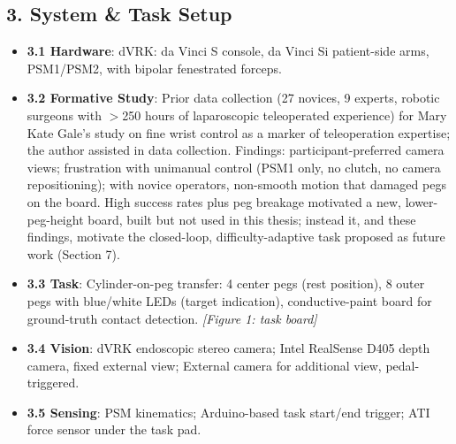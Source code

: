 \documentclass[11pt]{article}
\begin{document}
\subsection*{3. System \& Task Setup}
\begin{itemize}
  \item \textbf{3.1 Hardware}: dVRK: da Vinci S console, da Vinci Si
  patient-side arms, PSM1/PSM2, with bipolar fenestrated forceps.
  \item \textbf{3.2 Formative Study}: Prior data collection (27
  novices, 9 experts, robotic surgeons with $>$250 hours of
  laparoscopic teleoperated experience) for Mary Kate Gale's study on
  fine wrist control as a marker of teleoperation expertise; the author
  assisted in data collection. Findings: participant-preferred camera
  views; frustration with unimanual control (PSM1 only, no clutch, no
  camera repositioning); with novice operators, non-smooth motion that
  damaged pegs on the board. High success rates plus peg breakage
  motivated a new, lower-peg-height board, built but not used in this
  thesis; instead it, and these findings, motivate the closed-loop,
  difficulty-adaptive task proposed as future work (Section 7).
  \item \textbf{3.3 Task}: Cylinder-on-peg transfer: 4 center pegs
  (rest position), 8 outer pegs with blue/white LEDs (target
  indication), conductive-paint board for ground-truth contact
  detection. \emph{[Figure 1: task board]}
  \item \textbf{3.4 Vision}: dVRK endoscopic stereo camera; Intel
  RealSense D405 depth camera, fixed external view; External camera for additional view, pedal-triggered.
  \item \textbf{3.5 Sensing}: PSM kinematics; Arduino-based
  task start/end trigger; ATI force sensor under the task pad.
\end{itemize}
\end{document}
